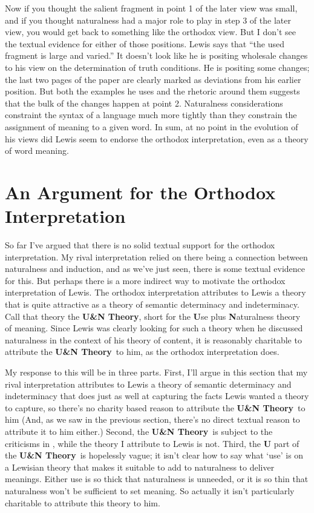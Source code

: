 Now if you thought the salient fragment in point 1 of the later view was small, and if you thought naturalness had a major role to play in step 3 of the later view, you would get back to something like the orthodox view. But I don't see the textual evidence for either of those positions. Lewis says that ``the used fragment is large and varied.'' \citep[110]{Lewis1992a} It doesn't look like he is positing wholesale changes to his view on the determination of truth conditions. He is positing some changes; the last two pages of the paper are clearly marked as deviations from his earlier position. But both the examples he uses and the rhetoric around them suggests that the bulk of the changes happen at point 2. Naturalness considerations constraint the syntax of a language much more tightly than they constrain the assignment of meaning to a given word. In sum, at no point in the evolution of his views did Lewis seem to endorse the orthodox interpretation, even as a theory of word meaning.

\section{An Argument for the Orthodox Interpretation}

\newcommand{\UNT}{\textbf{U\&N Theory}}

So far I've argued that there is no solid textual support for the orthodox interpretation. My rival interpretation relied on there being a connection between naturalness and induction, and as we've just seen, there is some textual evidence for this. But perhaps there is a more indirect way to motivate the orthodox interpretation of Lewis. The orthodox interpretation attributes to Lewis a theory that is quite attractive as a theory of semantic determinacy and indeterminacy. Call that theory the \UNT, short for the \textbf{U}se plus \textbf{N}aturalness theory of meaning. Since Lewis was clearly looking for such a theory when he discussed naturalness in the context of his theory of content, it is reasonably charitable to attribute the \UNT\ to him, as the orthodox interpretation does.

My response to this will be in three parts. First, I'll argue in this section that my rival interpretation attributes to Lewis a theory of semantic determinacy and indeterminacy that does just as well at capturing the facts Lewis wanted a theory to capture, so there's no charity based reason to attribute the \UNT\ to him (And, as we saw in the previous section, there's no direct textual reason to attribute it to him either.)  Second, the \UNT\ is subject to the criticisms in \citet{Williams2007}, while the theory I attribute to Lewis is not. Third, the \textbf{U} part of the \UNT\ is hopelessly vague; it isn't clear how to say what `use' is on a Lewisian theory that makes it suitable to add to naturalness to deliver meanings. Either use is so thick that naturalness is unneeded, or it is so thin that naturalness won't be sufficient to set meaning. So actually it isn't particularly charitable to attribute this theory to him.

